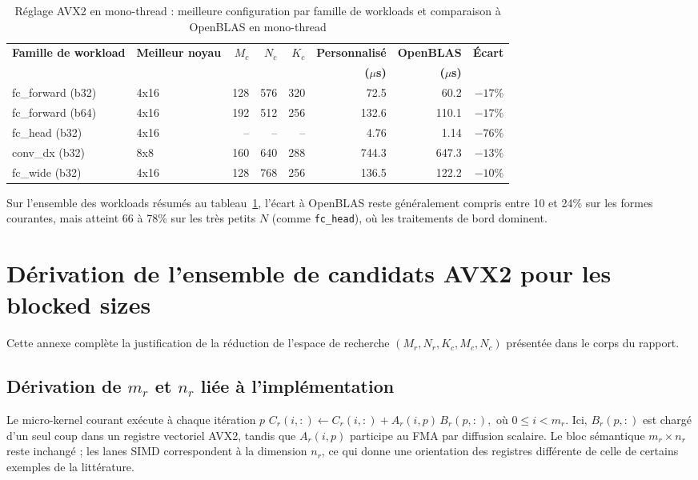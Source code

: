 \documentclass[a4paper,11pt,oneside]{article}
\begin{document}
\begin{table}[H]
\centering
\begin{tabular}{p{}lrrrrrr}
\toprule
\textbf{Famille de workload} & \textbf{Meilleur noyau} & $M_c$ & $N_c$ & $K_c$ &
\textbf{Personnalisé} & \textbf{OpenBLAS} & \textbf{Écart} \\
 & & & & & \textbf{($\mu$s)} & \textbf{($\mu$s)} & \\
\midrule
fc\_forward (b32) & 4x16 & 128 & 576 & 320 & 72.5  & 60.2 & $-17\%$ \\
fc\_forward (b64) & 4x16 & 192 & 512 & 256 & 132.6 & 110.1 & $-17\%$ \\
fc\_head (b32)    & 4x16 & --  & --  & --  & 4.76  & 1.14 & $-76\%$ \\
conv\_dx (b32)    & 8x8  & 160 & 640 & 288 & 744.3 & 647.3 & $-13\%$ \\
fc\_wide (b32)    & 4x16 & 128 & 768 & 256 & 136.5 & 122.2 & $-10\%$ \\
\bottomrule
\end{tabular}
\caption{Réglage AVX2 en mono-thread : meilleure configuration par famille de workloads et comparaison à OpenBLAS en mono-thread}
\label{tab:avx2_tuning_results}
\end{table}

Sur l'ensemble des workloads résumés au tableau~\ref{tab:avx2_tuning_results}, l'écart à OpenBLAS reste généralement compris entre 10 et 24\% sur les formes courantes, mais atteint 66 à 78\% sur les très petits $N$ (comme \texttt{fc\_head}), où les traitements de bord dominent.

\section{Dérivation de l'ensemble de candidats AVX2 pour les blocked sizes}\label{app:blocked_size_tuning}

Cette annexe complète la justification de la réduction de l'espace de recherche $(M_r,N_r,K_c,M_c,N_c)$ présentée dans le corps du rapport.

\subsection{Dérivation de $m_r$ et $n_r$ liée à l'implémentation}

Le micro-kernel courant exécute à chaque itération $p$
$
C_r(i,:) \leftarrow C_r(i,:) + A_r(i,p)\,B_r(p,:),
$
où $0 \le i < m_r$. Ici, $B_r(p,:)$ est chargé d'un seul coup dans un registre vectoriel AVX2, tandis que $A_r(i,p)$ participe au FMA par diffusion scalaire. Le bloc sémantique $m_r \times n_r$ reste inchangé ; les lanes SIMD correspondent à la dimension $n_r$, ce qui donne une orientation des registres différente de celle de certains exemples de la littérature.
\end{document}
